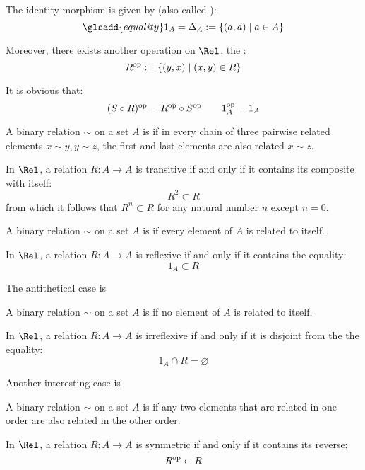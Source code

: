   The identity morphism is given by  (also called ):
  \begin{equation*}\glsadd{equality}
    1_A=\Delta_A:=\{(a,a)\mid a\in A\}
  \end{equation*}

  Moreover, there exists another operation on $\Rel$, the :
  \begin{equation*}
    R^{\operatorname{op}}:=\{(y,x)\mid(x,y)\in R\}
  \end{equation*}

  It is obvious that:
  \begin{equation*}
    (S\circ R)^{\operatorname{op}}=R^{\operatorname{op}}\circ S^{\operatorname{op}}\qquad 1_A^{\operatorname{op}}=1_A
  \end{equation*}

  \begin{defn}
    A binary relation $\sim$ on a set $A$ is  if in every chain of three pairwise related elements $x\sim y, y\sim z$, the first and last elements are also related $x\sim z$.
  \end{defn}
  In $\Rel$, a relation $R\colon A\to A$ is transitive if and only if it contains its composite with itself:
  \begin{equation*}
    R^2\subset R
  \end{equation*}
  from which it follows that $R^n\subset R$ for any natural number $n$ except $n=0$.

  \begin{defn}
    A binary relation $\sim$ on a set $A$ is  if every element of $A$ is related to itself.
  \end{defn}
  In $\Rel$, a relation $R\colon A\to A$ is reflexive if and only if it contains the equality:
  \begin{equation*}
    1_A\subset R
  \end{equation*}

  The antithetical case is
  \begin{defn}
    A binary relation $\sim$ on a set $A$ is  if no element of $A$ is related to itself.
  \end{defn}
  In $\Rel$, a relation $R\colon A\to A$ is irreflexive if and only if it is disjoint from the the equality:
  \begin{equation*}
    1_A\cap R=\varnothing
  \end{equation*}

  Another interesting case is
  \begin{defn}
    A binary relation $\sim$ on a set $A$ is  if any two elements that are related in one order are also related in the other order.
  \end{defn}
  In $\Rel$, a relation $R\colon A\to A$ is symmetric if and only if it contains its reverse:
  \begin{equation*}
    R^{\operatorname{op}}\subset R
  \end{equation*}

